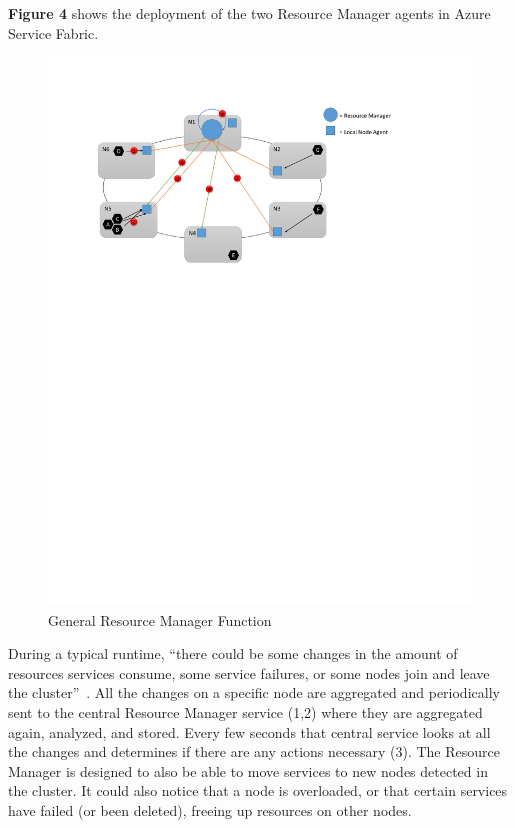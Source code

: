 {\bf Figure 4} shows the deployment of the two Resource Manager agents in
Azure Service Fabric.

\begin{figure}[!ht]
  \centering\includegraphics[width=\columnwidth]{images/fig4.pdf}
  \caption{General Resource Manager Function~\cite{hid-sp18-501-fig2and3}}
\label{f:architecture}
\end{figure}

During a typical runtime, ``there could be some changes in the amount of
resources services consume, some service failures, or some nodes join
and leave the cluster''~\cite{hid-sp18-501-fig2and3}.  All the changes
on a specific node are aggregated and periodically sent to the central
Resource Manager service (1,2) where they are aggregated again,
analyzed, and stored.  Every few seconds that central service looks at
all the changes and determines if there are any actions necessary
(3). The Resource Manager is designed to also be able to move services
to new nodes detected in the cluster. It could also notice that a node
is overloaded, or that certain services have failed (or been deleted),
freeing up resources on other nodes.

